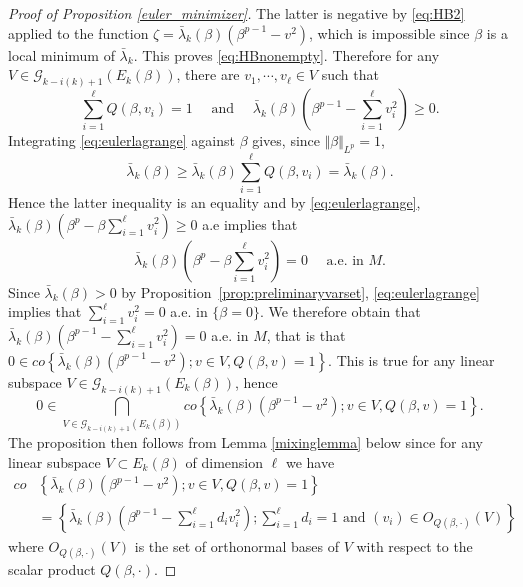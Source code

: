 \documentclass[10pt]{amsart}
\numberwithin{equation}{section}
\theoremstyle{plain}
\theoremstyle{remark}
\begin{document}
\begin{proof}[Proof of Proposition \ref{euler_minimizer}]
The latter is negative by  \eqref{eq:HB2} applied to the function $\zeta = \bar{\lambda}_k(\beta)(\beta^{p-1}-v^2)$, which is impossible since $\beta$ is a local minimum of $\bar{\lambda}_k$. This proves \eqref{eq:HBnonempty}.  Therefore for any $V \in \mathcal{G}_{k-i(k)+1}(E_k(\beta))$, there are $v_1,\cdots,v_\ell \in V$ such that
\begin{equation} \label{eq:eulerlagrange} \sum_{i=1}^\ell Q(\beta,v_i) = 1 \quad \text{ and }\quad \bar{\lambda}_k(\beta)(\beta^{p-1}-\sum_{i=1}^\ell v_i^2) \geq 0. \end{equation}
Integrating \eqref{eq:eulerlagrange} against $\beta$ gives, since $\Vert \beta \Vert_{L^p} = 1$,
$$ \bar{\lambda}_k(\beta) \ge \bar{\lambda}_k(\beta) \sum_{i=1}^\ell Q(\beta,v_i) =  \bar{\lambda}_k(\beta) . $$%
Hence the latter inequality is an equality and by \eqref{eq:eulerlagrange}, $\bar{\lambda}_k(\beta)(\beta^{p}- \beta \sum_{i=1}^\ell v_i^2) \geq 0$ a.e implies that
$$\bar{\lambda}_k(\beta)\left( \beta^p - \beta \sum_{i=1}^\ell v_i^2 \right) = 0  \quad \text{ a.e. in } M.$$
Since $ \bar{\lambda}_k(\beta) >0$ by Proposition~\ref{prop:preliminaryvarset}, \eqref{eq:eulerlagrange} implies that $\sum_{i=1}^{\ell} v_i^2 = 0$ a.e. in $\{ \beta = 0 \}$.  We therefore obtain that 
$\bar{\lambda}_k(\beta)\left(\beta^{p-1}-\sum_{i=1}^\ell v_i^2\right) = 0$ a.e. in $M$, that is that $ 0 \in  co \left\{ \bar{\lambda}_k(\beta) \left( \beta^{p-1} - v^2 \right) ; v \in V, Q(\beta,v) = 1 \right\} $. This is true for any linear subspace $V \in \mathcal{G}_{k-i(k)+1}(E_k(\beta))$, hence 
\begin{equation*} 0\in   \bigcap_{V \in \mathcal{G}_{k - i(k) + 1}(E_k(\beta))} co \left\{ \bar{\lambda}_k(\beta) \left( \beta^{p-1} - v^2 \right) ; v \in V, Q(\beta,v) = 1 \right\}.
\end{equation*}
The proposition then follows from Lemma \ref{mixinglemma} below since for any linear subspace $V\subset E_k(\beta)$ of dimension $\ell$ we have
\begin{equation} 
\begin{split} co & \left\{ \bar{\lambda}_k(\beta) \left( \beta^{p-1} - v^2 \right) ; v \in V, Q(\beta,v) = 1 \right\} \\ & = \left\{ \bar{\lambda}_k(\beta) \left( \beta^{p-1} - \sum_{i=1}^\ell d_i v_i^2 \right) ; \sum_{i=1}^\ell d_i = 1 \text{ and } (v_i) \in O_{Q(\beta,\cdot)}(V)  \right\}
\end{split} \end{equation}
where $O_{Q(\beta,\cdot)}(V)$ is the set of orthonormal bases of $V$ with respect to the scalar product $Q(\beta,\cdot)$.
\end{proof}
\end{document}
